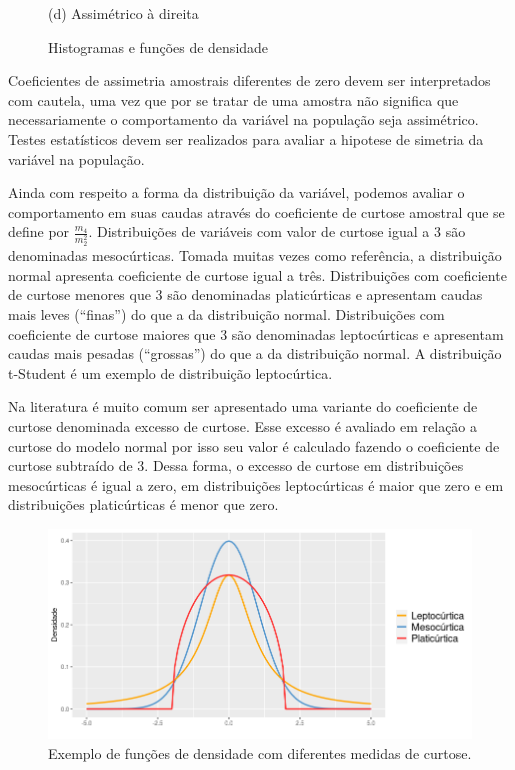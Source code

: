 \documentclass[
  letterpaper,
  DIV=11,
  numbers=noendperiod]{scrreprt}
\begin{document}
\begin{figure}
\begin{minipage}[t]{0.50\linewidth}
{{}

\caption{(d) Assimétrico à direita}

}

\end{minipage}%

\caption{\label{fig-assim}Histogramas e funções de densidade}

\end{figure}

Coeficientes de assimetria amostrais diferentes de zero devem ser
interpretados com cautela, uma vez que por se tratar de uma amostra não
significa que necessariamente o comportamento da variável na população
seja assimétrico. Testes estatísticos devem ser realizados para avaliar
a hipotese de simetria da variável na população.

Ainda com respeito a forma da distribuição da variável, podemos avaliar
o comportamento em suas caudas através do coeficiente de curtose
amostral que se define por \(\frac{m_4}{m_2^{2}}\). Distribuições de
variáveis com valor de curtose igual a 3 são denominadas mesocúrticas.
Tomada muitas vezes como referência, a distribuição normal apresenta
coeficiente de curtose igual a três. Distribuições com coeficiente de
curtose menores que 3 são denominadas platicúrticas e apresentam caudas
mais leves (``finas'') do que a da distribuição normal. Distribuições
com coeficiente de curtose maiores que 3 são denominadas leptocúrticas e
apresentam caudas mais pesadas (``grossas'') do que a da distribuição
normal. A distribuição t-Student é um exemplo de distribuição
leptocúrtica.

Na literatura é muito comum ser apresentado uma variante do coeficiente
de curtose denominada excesso de curtose. Esse excesso é avaliado em
relação a curtose do modelo normal por isso seu valor é calculado
fazendo o coeficiente de curtose subtraído de 3. Dessa forma, o excesso
de curtose em distribuições mesocúrticas é igual a zero, em
distribuições leptocúrticas é maior que zero e em distribuições
platicúrticas é menor que zero.

\begin{figure}

{\centering \includegraphics{./figuras_descritiva/Curtose.png}

}

\caption{\label{fig-Curto}Exemplo de funções de densidade com diferentes
medidas de curtose.}

\end{figure}
\end{document}
